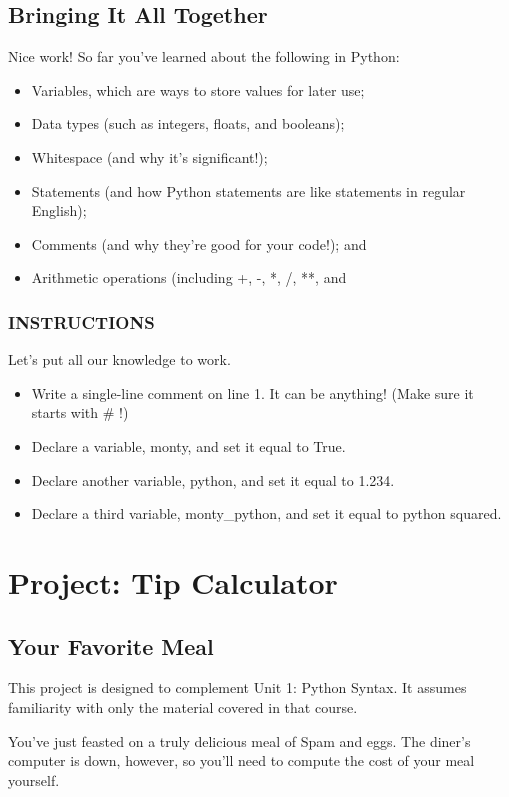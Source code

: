 \documentclass[12pt,a4paper,final,twoside,onecolumn,titlepage]{book}
\begin{document}
\subsection{Bringing It All Together}
Nice work! So far you've learned about the following in Python:
\begin{itemize}
\item Variables, which are ways to store values for later use;
\item Data types (such as integers, floats, and booleans);
\item Whitespace (and why it's significant!);
\item Statements (and how Python statements are like statements in regular English);
\item Comments (and why they're good for your code!); and
\item Arithmetic operations (including +, -, *, /, **, and %
\end{itemize}

\subsubsection{INSTRUCTIONS}
Let's put all our knowledge to work.
\begin{itemize}
\item Write a single-line comment on line 1. It can be anything! (Make sure it starts with \# !)
\item Declare a variable, monty, and set it equal to True.
\item Declare another variable, python, and set it equal to 1.234.
\item Declare a third variable, monty\_python, and set it equal to python squared.
\end{itemize}

\section{Project: Tip Calculator}
\subsection{Your Favorite Meal}
This project is designed to complement Unit 1: Python Syntax. It assumes familiarity with only the material covered in that course.

You've just feasted on a truly delicious meal of Spam and eggs. The diner's computer is down, however, so you'll need to compute the cost of your meal yourself.
\end{document}
